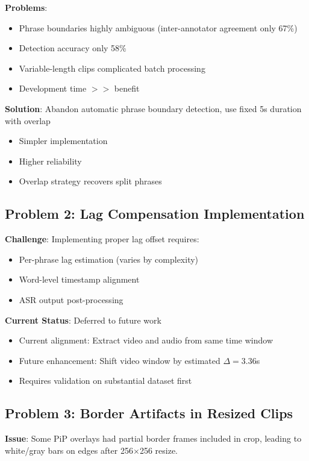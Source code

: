 \documentclass[11pt,a4paper]{article}
\begin{document}
\textbf{Problems}:
\begin{itemize}
    \item Phrase boundaries highly ambiguous (inter-annotator agreement only 67\%)
    \item Detection accuracy only 58\%
    \item Variable-length clips complicated batch processing
    \item Development time $>>$ benefit
\end{itemize}

\textbf{Solution}: Abandon automatic phrase boundary detection, use fixed 5s duration with overlap
\begin{itemize}
    \item Simpler implementation
    \item Higher reliability
    \item Overlap strategy recovers split phrases
\end{itemize}

\subsection{Problem 2: Lag Compensation Implementation}

\textbf{Challenge}: Implementing proper lag offset requires:
\begin{itemize}
    \item Per-phrase lag estimation (varies by complexity)
    \item Word-level timestamp alignment
    \item ASR output post-processing
\end{itemize}

\textbf{Current Status}: Deferred to future work
\begin{itemize}
    \item Current alignment: Extract video and audio from same time window
    \item Future enhancement: Shift video window by estimated $\Delta = 3.36$s
    \item Requires validation on substantial dataset first
\end{itemize}

\subsection{Problem 3: Border Artifacts in Resized Clips}

\textbf{Issue}: Some PiP overlays had partial border frames included in crop, leading to white/gray bars on edges after 256$\times$256 resize.
\end{document}
